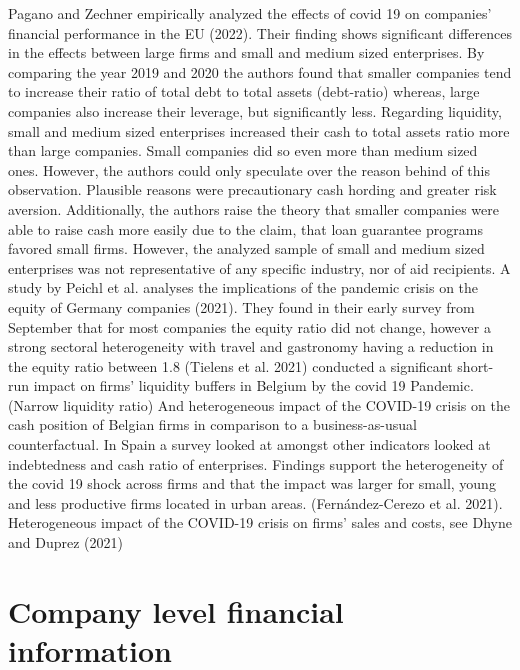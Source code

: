 Pagano and Zechner empirically analyzed the effects of covid 19 on companies’ financial performance in the EU (2022). Their finding shows significant differences in the effects between large firms and small and medium sized enterprises. 
By comparing the year 2019 and 2020 the authors found that smaller companies tend to increase their ratio of total debt to total assets (debt-ratio) whereas, large companies also increase their leverage, but significantly less.
Regarding liquidity, small and medium sized enterprises increased their cash to total assets ratio more than large companies. Small companies did so even more than medium sized ones. However, the authors could only speculate over the reason behind of this observation. Plausible reasons were precautionary cash hording and greater risk aversion. Additionally, the authors raise the theory that smaller companies were able to raise cash more easily due to the claim, that loan guarantee programs favored small firms. However, the analyzed sample of small and medium sized enterprises was not representative of any specific industry, nor of aid recipients. 
A study by Peichl et al. analyses the implications of the pandemic crisis on the equity of Germany companies (2021). They found in their early survey from September that for most companies the equity ratio did not change, however a strong sectoral heterogeneity with travel and gastronomy having a reduction in the equity ratio between 1.8 %
(Tielens et al. 2021) conducted a significant short-run impact on firms’ liquidity buffers in Belgium by the covid 19 Pandemic. (Narrow liquidity ratio) And heterogeneous impact of the COVID-19 crisis on the cash position of Belgian firms in comparison to a business-as-usual counterfactual.
In Spain a survey looked at amongst other indicators looked at indebtedness and cash ratio of enterprises. Findings support the heterogeneity of the covid 19 shock across firms and that the impact was larger for small, young and less productive firms located in urban areas. (Fernández-Cerezo et al. 2021).
Heterogeneous impact of the COVID-19 crisis on firms’ sales and costs, see Dhyne and Duprez (2021)





\section{Company level financial information}

